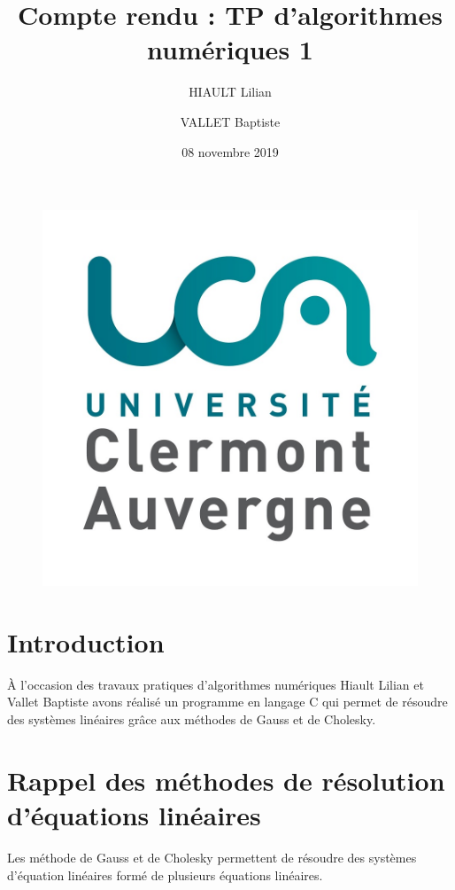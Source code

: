 \documentclass{article}
\title{Compte rendu : TP d'algorithmes numériques 1}
\author{HIAULT Lilian \and VALLET Baptiste}
\date{08 novembre 2019}
\begin{document}
\begin{figure}[t]
 \centerline{\includegraphics[scale=0.1]{logoUCA.jpg}}
\end{figure}

\maketitle

\tableofcontents

\newpage

\section*{Introduction}

À l'occasion des travaux pratiques d'algorithmes numériques Hiault Lilian et Vallet Baptiste avons réalisé un programme en langage C qui permet de résoudre des systèmes linéaires grâce aux méthodes de Gauss et de Cholesky.


\section{Rappel des méthodes de résolution d'équations linéaires}

Les méthode de Gauss et de Cholesky permettent de résoudre des systèmes d'équation linéaires formé de plusieurs équations linéaires.
\end{document}
